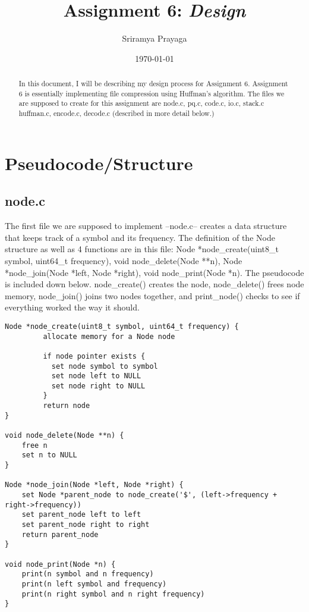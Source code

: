 \documentclass[11pt]{article}
\title{Assignment 6: \emph{Design}}
\author{Sriramya Prayaga}
\date{\today}
\begin{document}
 \maketitle

\begin{abstract}
\begin{center}
	In this document, I will be describing my design process for Assignment 6. Assignment 6 is essentially implementing file compression using Huffman's algorithm. The files we are supposed to create for this assignment are node.c, pq.c, code.c, io.c, stack.c huffman.c, encode.c, decode.c (described in more detail below.)
	
\end{center}
\end{abstract}
\section{Pseudocode/Structure}

\subsection{node.c}
The first file we are supposed to implement --node.c-- creates a data structure that keeps track of a symbol and its frequency. The definition of the Node structure as well as 4 functions are in this file: Node *node\_create(uint8\_t symbol, uint64\_t frequency), void node\_delete(Node **n), Node *node\_join(Node *left, Node *right), void node\_print(Node *n). The pseudocode is included down below. node\_create() creates the node, node\_delete() frees node memory, node\_join() joins two nodes together, and print\_node() checks to see if everything worked the way it should.

\begin{verbatim}
Node *node_create(uint8_t symbol, uint64_t frequency) {
         allocate memory for a Node node
         
         if node pointer exists {
           set node symbol to symbol
           set node left to NULL
           set node right to NULL
         }
         return node
}

void node_delete(Node **n) {	
    free n
    set n to NULL
}

Node *node_join(Node *left, Node *right) {
    set Node *parent_node to node_create('$', (left->frequency + right->frequency))
    set parent_node left to left
    set parent_node right to right
    return parent_node
}

void node_print(Node *n) {
    print(n symbol and n frequency)
    print(n left symbol and frequency)
    print(n right symbol and n right frequency)
}
\end{verbatim}
\end{document}
